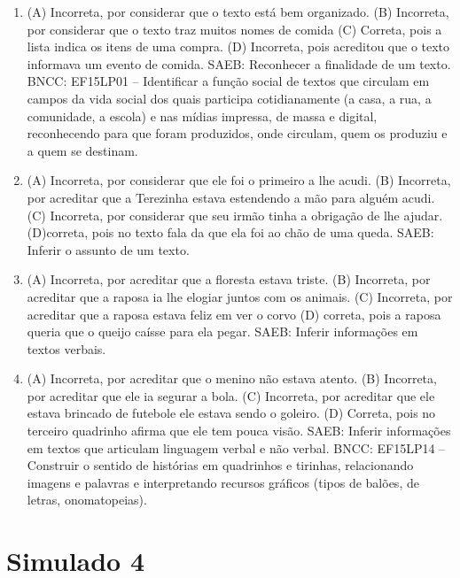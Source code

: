 \begin{enumerate}
\item
(A) Incorreta, por considerar que o texto está bem organizado.
(B) Incorreta, por considerar que o texto traz muitos nomes de comida
(C) Correta, pois a lista indica os itens de uma compra.
(D) Incorreta, pois acreditou que o texto informava um evento de comida.
SAEB: Reconhecer a finalidade de um texto.
BNCC: EF15LP01 -- Identificar a função social de textos que
circulam em campos da vida social dos quais participa cotidianamente (a
casa, a rua, a comunidade, a escola) e nas mídias impressa, de massa e
digital, reconhecendo para que foram produzidos, onde circulam, quem os
produziu e a quem se destinam.

\item
(A) Incorreta, por considerar que ele foi o primeiro a lhe acudi.
(B) Incorreta, por acreditar que a Terezinha estava estendendo a mão
para alguém acudi.
(C) Incorreta, por considerar que seu irmão tinha a obrigação de lhe
ajudar.
(D)correta, pois no texto fala da que ela foi ao chão de uma queda.
SAEB: Inferir o assunto de um texto.

\item
(A) Incorreta, por acreditar que a floresta estava triste.
(B) Incorreta, por acreditar que a raposa ia lhe elogiar juntos com os
animais.
(C) Incorreta, por acreditar que a raposa estava feliz em ver o corvo
(D) correta, pois a raposa queria que o queijo caísse para ela
pegar.
SAEB: Inferir informações em textos verbais.

\item
(A) Incorreta, por acreditar que o menino não estava atento.
(B) Incorreta, por acreditar que ele ia segurar a bola.
(C) Incorreta, por acreditar que ele estava brincado de futebole ele
estava sendo o goleiro.
(D) Correta, pois no terceiro quadrinho afirma que ele tem pouca visão.
SAEB: Inferir informações em textos que articulam linguagem
verbal e não verbal.
BNCC: EF15LP14 -- Construir o sentido de histórias em
quadrinhos e tirinhas, relacionando imagens e palavras e interpretando
recursos gráficos (tipos de balões, de letras, onomatopeias).
\end{enumerate}

\section*{Simulado 4}

